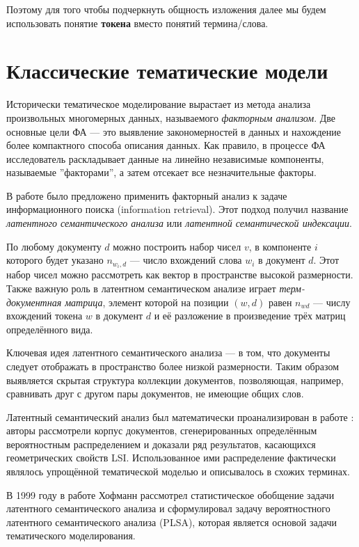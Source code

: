 Поэтому для того чтобы подчеркнуть общность изложения далее мы будем использовать понятие \textbf{токена} вместо понятий термина/слова.

\section{Классические тематические модели}

Исторически тематическое моделирование вырастает из метода анализа произвольных многомерных данных, называемого \textit{факторным анализом}. Две основные цели ФА --- это выявление закономерностей в данных и нахождение более компактного способа описания данных. Как правило, в процессе ФА исследователь раскладывает данные на линейно независимые компоненты, называемые ''факторами'', а затем отсекает все незначительные факторы. 

В работе \cite{deerwester1990indexing} было предложено применить факторный анализ к задаче информационного поиска (information retrieval). Этот подход получил название \textit{латентного семантического анализа} или \textit{латентной семантической индексации}.

По любому документу $d$ можно построить набор чисел $v$, в компоненте $i$ которого будет указано $n_{{w_i}, d}$ --- число вхождений слова $w_i$ в документ $d$. Этот набор чисел можно рассмотреть как вектор в пространстве высокой размерности. Также важную роль в латентном семантическом анализе играет \textit{терм-документная матрица}, элемент которой на позиции $(w, d)$ равен $n_{wd}$ --- числу вхождений токена $w$ в документ $d$ и её разложение в произведение трёх матриц определённого вида.

Ключевая идея латентного семантического анализа --- в том, что документы следует отображать в пространство более низкой размерности. Таким образом выявляется скрытая структура коллекции документов, позволяющая, например, сравнивать друг с другом пары документов, не имеющие общих слов.

Латентный семантический анализ был математически проанализирован в работе \cite{papadimitriou1998latent}: авторы рассмотрели корпус документов, сгенерированных определённым вероятностным распределением и доказали ряд результатов, касающихся геометрических свойств LSI. Использованное ими распределение фактически являлось упрощённой тематической моделью и описывалось в схожих терминах.

В 1999 году в работе \cite{hofmann1999probabilistic} Хофманн рассмотрел статистическое обобщение задачи латентного семантического анализа и сформулировал задачу вероятностного латентного семантического анализа (PLSA), которая является основой задачи тематического моделирования. 

